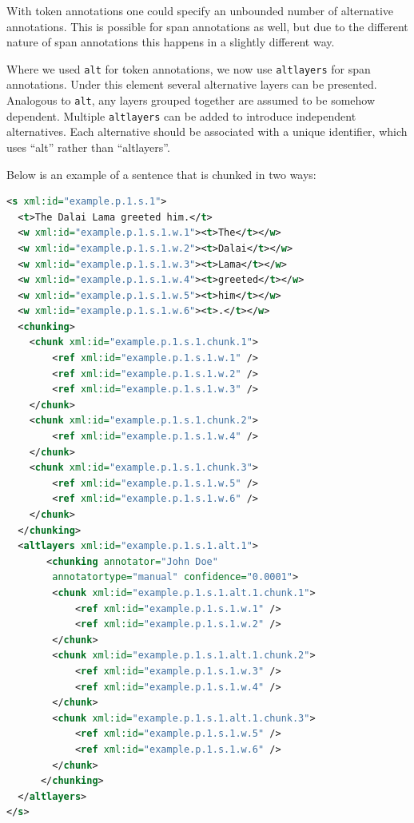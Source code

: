 \documentclass[a4paper,12pt]{report}
\begin{document}
With token annotations one could specify an unbounded number of alternative annotations. This is possible for span annotations as well, but due to the different nature of span annotations this happens in a slightly different way.

Where we used \texttt{alt} for token annotations, we now use \texttt{altlayers} for span annotations. Under this element several alternative layers can be presented. Analogous to \texttt{alt}, any layers grouped together are assumed to be somehow dependent. Multiple \texttt{altlayers} can be added to introduce independent alternatives. Each alternative should be associated with a unique identifier, which uses ``alt'' rather than ``altlayers''. 

Below is an example of a sentence that is chunked in two ways:

\begin{lstlisting}[language=xml]
<s xml:id="example.p.1.s.1">
  <t>The Dalai Lama greeted him.</t>
  <w xml:id="example.p.1.s.1.w.1"><t>The</t></w>
  <w xml:id="example.p.1.s.1.w.2"><t>Dalai</t></w>
  <w xml:id="example.p.1.s.1.w.3"><t>Lama</t></w>
  <w xml:id="example.p.1.s.1.w.4"><t>greeted</t></w>
  <w xml:id="example.p.1.s.1.w.5"><t>him</t></w>
  <w xml:id="example.p.1.s.1.w.6"><t>.</t></w>
  <chunking>
    <chunk xml:id="example.p.1.s.1.chunk.1">       
        <ref xml:id="example.p.1.s.1.w.1" />       
        <ref xml:id="example.p.1.s.1.w.2" />       
        <ref xml:id="example.p.1.s.1.w.3" />        
    </chunk>
    <chunk xml:id="example.p.1.s.1.chunk.2">       
        <ref xml:id="example.p.1.s.1.w.4" />
    </chunk>
    <chunk xml:id="example.p.1.s.1.chunk.3">       
        <ref xml:id="example.p.1.s.1.w.5" />
        <ref xml:id="example.p.1.s.1.w.6" />
    </chunk>    
  </chunking>
  <altlayers xml:id="example.p.1.s.1.alt.1">
       <chunking annotator="John Doe" 
        annotatortype="manual" confidence="0.0001">
        <chunk xml:id="example.p.1.s.1.alt.1.chunk.1">       
            <ref xml:id="example.p.1.s.1.w.1" />       
            <ref xml:id="example.p.1.s.1.w.2" />                       
        </chunk>
        <chunk xml:id="example.p.1.s.1.alt.1.chunk.2">       
            <ref xml:id="example.p.1.s.1.w.3" />  
            <ref xml:id="example.p.1.s.1.w.4" />
        </chunk>
        <chunk xml:id="example.p.1.s.1.alt.1.chunk.3">       
            <ref xml:id="example.p.1.s.1.w.5" />
            <ref xml:id="example.p.1.s.1.w.6" />
        </chunk>    
      </chunking>   
  </altlayers>
</s>
\end{lstlisting}
\end{document}
